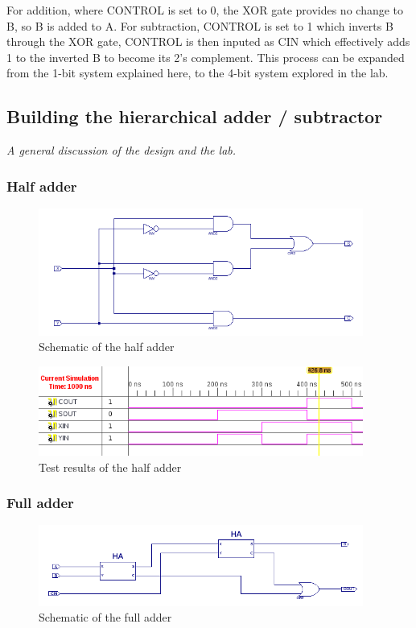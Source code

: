 \documentclass[11pt]{article}
\begin{document}
For addition, where CONTROL is set to 0, the XOR gate provides no change to B, so B is added to A. For subtraction, CONTROL is set to 1 which inverts B through the XOR gate, CONTROL is then inputed as CIN which effectively adds 1 to the inverted B to become its 2's complement. This process can be expanded from the 1-bit system explained here, to the 4-bit system explored in the lab.

\subsection{Building the hierarchical adder / subtractor}
{\em A general discussion of the design and the lab.}


\subsubsection{Half adder}
\begin{figure}[htpb]
	\centering
	\includegraphics[width=0.95\textwidth]{HA-schematic}
	\caption{Schematic of the half adder}
	\label{fig:HA_schematic}
\end{figure}

\begin{figure}[htpb]
	\centering
	\includegraphics[width=0.95\textwidth]{HA_test}
	\caption{Test results of the half adder}
	\label{fig:HA_test}
\end{figure}

\subsubsection{Full adder}
\begin{figure}[htpb]
	\centering
	\includegraphics[width=0.95\textwidth]{FA-schematic}
	\caption{Schematic of the full adder}
	\label{fig:FA_schematic}
\end{figure}
\end{document}
